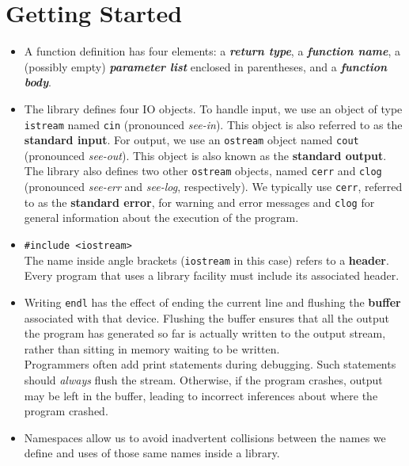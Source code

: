 \section{Getting Started}
\begin{itemize}

\item
A function definition has four elements: a \textbf{\textit{return type}}, a \textbf{\textit{function name}}, a (possibly empty) \textbf{\textit{parameter list}} enclosed in parentheses, and a \textbf{\textit{function body}}.

\item
The library defines four IO objects. To handle input, we use an object of type \texttt{istream} named \texttt{cin} (pronounced \textit{see-in}). This object is also referred to as the \textbf{standard input}. For output, we use an \texttt{ostream} object named \texttt{cout} (pronounced \textit{see-out}). This object is also known as the \textbf{standard output}. The library also defines two other \texttt{ostream} objects, named \texttt{cerr} and \texttt{clog} (pronounced \textit{see-err} and \textit{see-log}, respectively). We typically use \texttt{cerr}, referred to as the \textbf{standard error}, for warning and error messages and \texttt{clog} for general information about the execution of the program.

\item
\texttt{\#include <iostream>}\\
The name inside angle brackets (\texttt{iostream} in this case) refers to a \textbf{header}. Every program that uses a library facility must include its associated header.

\item
Writing \texttt{endl} has the effect of ending the current line and flushing the \textbf{buffer} associated with that device. Flushing the buffer ensures that all the output the program has generated so far is actually written to the output stream, rather than sitting in memory waiting to be written.\\
Programmers often add print statements during debugging. Such statements should \textit{always} flush the stream. Otherwise, if the program crashes, output may be left in the buffer, leading to incorrect inferences about where the program crashed.

\item
Namespaces allow us to avoid inadvertent collisions between the names we define and uses of those same names inside a library.


\end{itemize}

